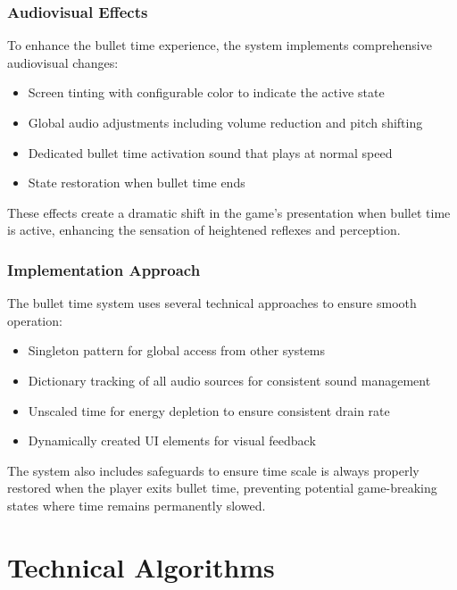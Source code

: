 \documentclass{article}
\begin{document}
    \subsubsection{Audiovisual Effects}
    To enhance the bullet time experience, the system implements comprehensive audiovisual changes:

    \begin{itemize}
        \item Screen tinting with configurable color to indicate the active state
        \item Global audio adjustments including volume reduction and pitch shifting
        \item Dedicated bullet time activation sound that plays at normal speed
        \item State restoration when bullet time ends
    \end{itemize}

    These effects create a dramatic shift in the game's presentation when bullet time is active, enhancing the sensation of heightened reflexes and perception.

    \subsubsection{Implementation Approach}
    The bullet time system uses several technical approaches to ensure smooth operation:

    \begin{itemize}
        \item Singleton pattern for global access from other systems
        \item Dictionary tracking of all audio sources for consistent sound management
        \item Unscaled time for energy depletion to ensure consistent drain rate
        \item Dynamically created UI elements for visual feedback
    \end{itemize}

    The system also includes safeguards to ensure time scale is always properly restored when the player exits bullet time, preventing potential game-breaking states where time remains permanently slowed.
    \appendix


    \section{Technical Algorithms}
    \label{appendix:algorithms}
\end{document}

